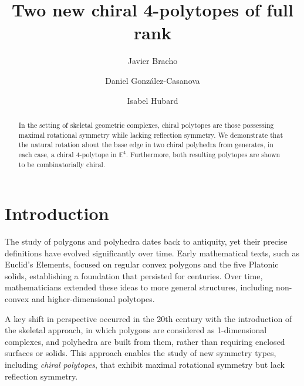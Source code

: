 \documentclass{amsart}
\begin{document}
\title{Two new chiral 4-polytopes of full rank}
\author{Javier Bracho} 
\address{Institute of Mathematics, National Autonomous University of Mexico (IM UNAM), 04510 Mexico City, Mexico}
\author{Daniel Gonz\'alez-Casanova}
\address{Institute of Mathematics, National Autonomous University of Mexico (IM UNAM), 04510 Mexico City, Mexico}
\author{Isabel Hubard}
\address{Institute of Mathematics, National Autonomous University of Mexico (IM UNAM), 04510 Mexico City, Mexico}

\begin{abstract}
In the setting of skeletal geometric complexes, chiral polytopes are those
possessing maximal rotational symmetry while lacking reflection symmetry. We
demonstrate that the natural rotation about the base edge in two chiral
polyhedra from \cite{petcox} generates, in each case, a chiral 4-polytope in
$\mathbb{E}^4$. Furthermore, both resulting polytopes are shown to be
combinatorially chiral. 
\end{abstract}

\maketitle 

\listoftodos\relax

\section{Introduction}
\label{section-introduction}

The study of polygons and polyhedra dates back to antiquity, yet their precise
definitions have evolved significantly over time. Early mathematical texts, such
as Euclid’s Elements, focused on regular convex polygons and the five Platonic
solids, establishing a foundation that persisted for centuries. Over time,
mathematicians extended these ideas to more general structures, including
non-convex and higher-dimensional polytopes.

A key shift in perspective occurred in the 20th century with the introduction of
the skeletal approach, in which polygons are considered as 1-dimensional
complexes, and polyhedra are built from them, rather than requiring enclosed
surfaces or solids.  This approach enables the study of new symmetry types,
including {\em chiral polytopes}, that exhibit maximal rotational symmetry but
lack reflection symmetry. 
\end{document}
